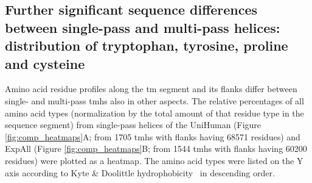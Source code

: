 \subsection{Further significant sequence differences between single-pass and multi-pass helices: distribution of tryptophan, tyrosine, proline and cysteine}

Amino acid residue profiles along the \gls{tm} segment and its flanks differ between single- and multi-pass \gls{tmh}s also in other aspects.
The relative percentages of all amino acid types (normalization by the total amount of that residue type in the sequence segment) from single-pass helices of the UniHuman (Figure \ref{fig:comp_heatmaps}A; from 1705 \gls{tmh}s with flanks having 68571 residues) and ExpAll (Figure \ref{fig:comp_heatmaps}B; from 1544 \gls{tmh}s with flanks having 60200 residues) were plotted as a heatmap.
The amino acid types were listed on the Y axis according to Kyte \& Doolittle hydrophobicity~\cite{Kyte1982} in descending order.

